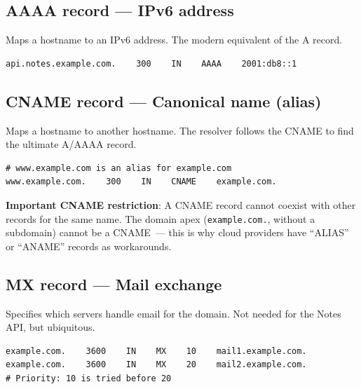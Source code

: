 \subsection*{AAAA record --- IPv6 address}\label{27-domain-and-dns:aaaa-record--ipv6-address}

Maps a hostname to an IPv6 address. The modern equivalent of the A record.

\begin{outputbox}[short]
\begin{Verbatim}[fontsize=\codesize, breaklines, breakanywhere, breaksymbolleft={\tiny\textcolor{muted}{$\hookrightarrow$}}]
api.notes.example.com.    300    IN    AAAA    2001:db8::1
\end{Verbatim}
\end{outputbox}

\subsection*{CNAME record --- Canonical name (alias)}\label{27-domain-and-dns:cname-record--canonical-name-alias}

Maps a hostname to another hostname. The resolver follows the CNAME to find the ultimate A/AAAA record.

\begin{outputbox}[short]
\begin{Verbatim}[fontsize=\codesize, breaklines, breakanywhere, breaksymbolleft={\tiny\textcolor{muted}{$\hookrightarrow$}}]
# www.example.com is an alias for example.com
www.example.com.    300    IN    CNAME    example.com.
\end{Verbatim}
\end{outputbox}

\noindent{}\textbf{Important CNAME restriction}: A CNAME record cannot coexist with other records for the same name. The domain apex (\texttt{example.com.}, without a subdomain) cannot be a CNAME~--- this is why cloud providers have ``ALIAS'' or ``ANAME'' records as workarounds.

\subsection*{MX record --- Mail exchange}\label{27-domain-and-dns:mx-record--mail-exchange}

Specifies which servers handle email for the domain. Not needed for the Notes API, but ubiquitous.

\begin{outputbox}[short]
\begin{Verbatim}[fontsize=\codesize, breaklines, breakanywhere, breaksymbolleft={\tiny\textcolor{muted}{$\hookrightarrow$}}]
example.com.    3600    IN    MX    10    mail1.example.com.
example.com.    3600    IN    MX    20    mail2.example.com.
# Priority: 10 is tried before 20
\end{Verbatim}
\end{outputbox}

